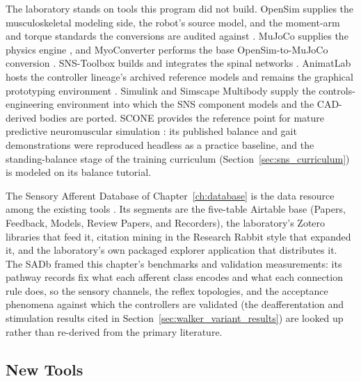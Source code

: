 The laboratory stands on tools this program did not build. OpenSim supplies the musculoskeletal modeling side, the robot's source model, and the moment-arm and torque standards the conversions are audited against \citep{delp_opensim_2007, seth_opensim_2018}. MuJoCo supplies the physics engine \citep{todorov_mujoco_2012}, and MyoConverter performs the base OpenSim-to-MuJoCo conversion \citep{caggiano_myosuite_2022, wang_myosim_2022}. SNS-Toolbox builds and integrates the spinal networks \citep{nourse_sns_2023}. AnimatLab hosts the controller lineage's archived reference models and remains the graphical prototyping environment \citep{cofer_animatlab_2010}. Simulink and Simscape Multibody supply the controls-engineering environment into which the SNS component models and the CAD-derived bodies are ported. SCONE provides the reference point for mature predictive neuromuscular simulation \citep{geijtenbeek_scone_2019}: its published balance and gait demonstrations were reproduced headless as a practice baseline, and the standing-balance stage of the training curriculum (Section~\ref{sec:sns_curriculum}) is modeled on its balance tutorial.

The Sensory Afferent Database of Chapter~\ref{ch:database} is the data resource among the existing tools \citep{bolen_sensory_2023}. Its segments are the five-table Airtable base (Papers, Feedback, Models, Review Papers, and Recorders), the laboratory's Zotero libraries that feed it, citation mining in the Research Rabbit style that expanded it, and the laboratory's own packaged explorer application that distributes it. The SADb framed this chapter's benchmarks and validation measurements: its pathway records fix what each afferent class encodes and what each connection rule does, so the sensory channels, the reflex topologies, and the acceptance phenomena against which the controllers are validated (the deafferentation and stimulation results cited in Section~\ref{sec:walker_variant_results}) are looked up rather than re-derived from the primary literature.

\subsection{New Tools}\label{sec:sns_new_tools}

